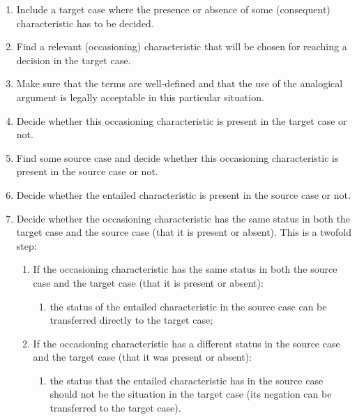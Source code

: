 		\begin{enumerate}
			\item Include a target case where the presence or absence of some (consequent) characteristic has to be decided.
			\item Find a relevant (occasioning) characteristic that will be chosen for reaching a decision in the target case.
			\item Make sure that the terms are well-defined and that the use of the analogical argument is legally acceptable in this particular situation. 
			\item Decide whether this occasioning characteristic is present in the target case or not.
			\item Find some source case and decide whether this occasioning characteristic is present in the source case or not.
			\item Decide whether the entailed characteristic is present in the source case or not.
			\item Decide whether the occasioning characteristic has the same status in both the target case and the source case (that it is present or absent). This is a twofold step:
				\begin{enumerate}
					\item If the occasioning characteristic has the same status in both the source case and the target case (that it is present or absent):
						\begin{enumerate}
							\item the status of the entailed characteristic in the source case can be transferred directly to the target case;
						\end{enumerate}
					\item If the occasioning characteristic has a different status in the source case and the target case (that it was present or absent):
						\begin{enumerate}
							\item the status that the entailed characteristic has in the source case should not be the situation in the target case (its negation can be transferred to the target case). 
						\end{enumerate}
				\end{enumerate}	
			\end{enumerate}

